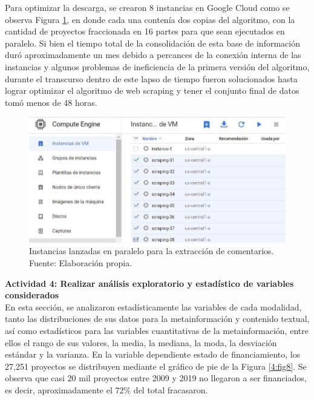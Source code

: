 Para optimizar la descarga, se crearon 8 instancias en Google Cloud como se observa Figura \ref{4:fig7}, en donde cada una contenía dos copias del algoritmo, con la cantidad de proyectos fraccionada en 16 partes para que sean ejecutados en paralelo. Si bien el tiempo total de la consolidación de esta base de información duró aproximadamente un mes debido a percances de la conexión interna de las instancias y algunos problemas de ineficiencia de la primera versión del algoritmo, durante el transcurso dentro de este lapso de tiempo fueron solucionados hasta lograr optimizar el algoritmo de web scraping y tener el conjunto final de datos tomó menos de 48 horas.

\begin{figure}[!ht]
	\begin{center}
		\includegraphics[width=1\textwidth]{4/figures/gc_instances_comments.jpg}
		\caption[Instancias lanzadas en paralelo para la extracción de comentarios]{Instancias lanzadas en paralelo para la extracción de comentarios.\\
			Fuente: Elaboración propia.}
		\label{4:fig7}
	\end{center}
\end{figure}

\textbf{Actividad 4: Realizar análisis exploratorio y estadístico de variables considerados}
\\
En esta sección, se analizaron estadísticamente las variables de cada modalidad, tanto las distribuciones de sus datos para la metainformación y contenido textual, así como estadísticos para las variables cuantitativas de la metainformación, entre ellos el rango de sus valores, la media, la mediana, la moda, la desviación estándar y la varianza. En la variable dependiente estado de financiamiento, los 27,251 proyectos se distribuyen mediante el gráfico de pie de la Figura \ref{4:fig8}. Se observa que casi 20 mil proyectos entre 2009 y 2019 no llegaron a ser financiados, es decir, aproximadamente el 72\% del total fracasaron.

